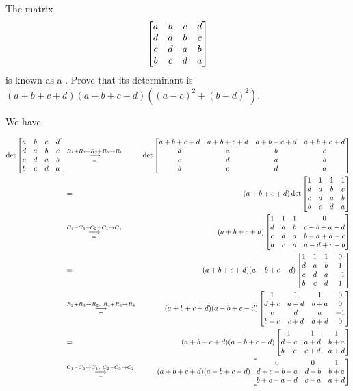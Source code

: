 \begin{pro}
The matrix  $$  \begin{bmatrix} a & b & c & d \cr d & a & b & c \cr c & d & a & b \cr b & c & d & a\cr         \end{bmatrix}
$$ is known as a . Prove that its determinant is $(a+b+c+d)(a-b+c-d)((a-c)^2+(b-d)^2)$.
\begin{answer}
 We have

 \begin{eqnarray*}\det \begin{bmatrix} a & b & c & d \cr d & a & b
& c \cr c & d & a & b \cr b & c & d & a\cr         \end{bmatrix} &
\grstep[=]{R_1+R_2+R_3+R_4\to R_1} & \det \begin{bmatrix} a+b+c+d &
a+b+c+d & a+b+c+d & a+b+c+d \cr d & a & b & c \cr c & d & a & b \cr
b & c & d & a\cr
\end{bmatrix}\\
& = & (a+b+c+d)\det \begin{bmatrix} 1 & 1 & 1 & 1 \cr d & a & b & c
\cr c & d & a & b \cr b & c & d & a\cr         \end{bmatrix}\\
& \grstep[=]{C_4-C_3+C_2-C_1\to C_4} & (a+b+c+d)\begin{bmatrix} 1 &
1 & 1 & 0\cr d & a & b & c-b+a-d \cr c & d & a & b-a+d-c \cr b & c &
d & a-d+c-b\cr
\end{bmatrix}\\
& = &  (a+b+c+d)(a-b+c-d)\begin{bmatrix} 1 & 1 & 1 & 0\cr d & a & b
& 1\cr c & d & a & -1 \cr b & c & d & 1\cr
\end{bmatrix}\\
& \grstep[=]{R_2+R_3\to R_2,\ R_4+R_3\to R_4} &
(a+b+c+d)(a-b+c-d)\begin{bmatrix} 1 & 1 & 1 & 0\cr d+c & a+d & b+a &
0\cr c & d & a & -1 \cr b+c & c+d & a+d & 0\cr
\end{bmatrix}\\
&= & (a+b+c+d)(a-b+c-d)\begin{bmatrix} 1 & 1 & 1 \cr d+c & a+d & b+a
\cr  b+c & c+d & a+d \cr
\end{bmatrix}\\
& \grstep[=]{C_1-C_3\to C_1, \ C_2-C_3\to C_2} &
(a+b+c+d)(a-b+c-d)\begin{bmatrix} 0 & 0 & 1 \cr d+c-b-a & d-b & b+a
\cr b+c-a-d & c-a
 & a+d \cr
\end{bmatrix}\\

\end{eqnarray*}
\end{answer}
\end{pro}
